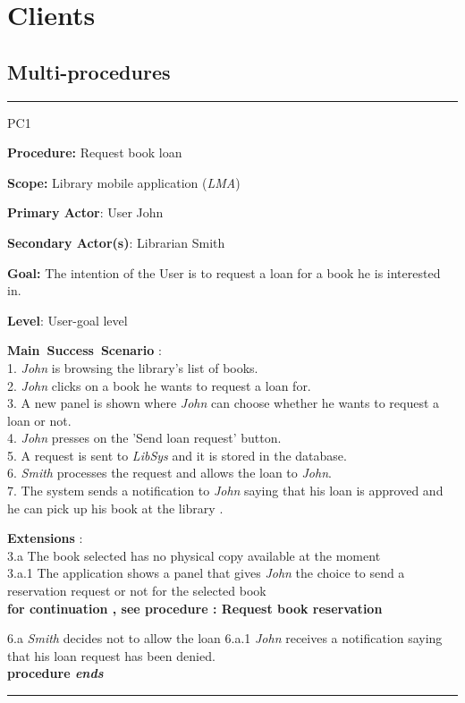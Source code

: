 \section{Clients}
\label{chap:usage_guide}

\subsection{Multi-procedures}

\vspace{0.5cm}
\hrule
\begin{lyxlist}{PC1}
\small{
\item [\textbf{Procedure:}] Request book loan
\item [\textbf{Scope:}] Library mobile application (\emph{LMA})
\item [\textbf{Primary Actor}:] User John
\item [\textbf{Secondary Actor(s)}:] Librarian Smith
\item [\textbf{Goal:}] The intention of the User is to request a loan for a book
he is interested in.
\item [\textbf{Level}:] User-goal level
\item [\textbf{Main~Success~Scenario}]:\\
1. \emph{John} is browsing the library's list of books. \\
2. \emph{John} clicks on a book he wants to request a loan for. \\
3. A new panel is shown where \emph{John} can choose whether he wants to
request a loan or not. \\
4. \emph{John} presses on the 'Send loan request' button. \\
5. A request is sent to \emph{LibSys} and it is stored in the database. \\
6. \emph{Smith}  processes the request and allows the loan to \emph{John}.\\ 
7. The system sends a notification to \emph{John} saying that his loan is
approved and he can pick up his book at the library .\\


\item [\textbf{Extensions}]:\\
3.a The book selected has no physical copy available at the moment\\
\hspace*{0.5cm} 3.a.1 The application shows a panel that gives \emph{John} the
choice to send a reservation request or not for the selected book \\
\hspace*{0.5cm} \textbf{for continuation , see procedure : Request book
reservation}

6.a \emph{Smith} decides not to allow the loan
\hspace*{0.5cm} 6.a.1 \emph{John} receives a notification saying that his loan
request has been denied.\\
\hspace*{0.5cm} \textbf{procedure \emph{ends}}

}

\end{lyxlist}
\hrule



